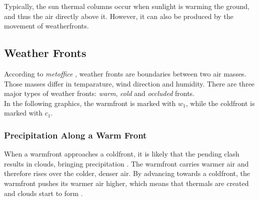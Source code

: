 \noindent
Typically, the sun \gls{thermal} columns occur when sunlight is warming the ground, and thus the air directly above it. 
However, it can also be produced by the movement of \gls{weatherfront}s.

\clearpage

\subsection{Weather Fronts}
According to \emph{metoffice} \cite{metoffice:weatherfronts}, weather fronts are boundaries between two air masses. Those masses differ in temparature, wind direction and humidity.
There are three major types of weather fronts: \emph{warm}, \emph{cold} and \emph{occluded} fronts.
\\
In the following graphics, the \gls{warmfront} is marked with \color{red}$w_1$\color{black}, while the \gls{coldfront} is marked with \color{cyan}$c_1$\color{black}.

\subsubsection{Precipitation Along a Warm Front}
When a \gls{warmfront} approaches a \gls{coldfront}, it is likely that the pending clash results in clouds, bringing \gls{precipitation} .
The \gls{warmfront} carries warmer air and therefore rises over the colder, denser air.
By advancing towards a \gls{coldfront}, the \gls{warmfront} pushes its warmer air higher,
which means that \gls{thermal}s are created and clouds start to form \cite{ww2010:warmfront}.


